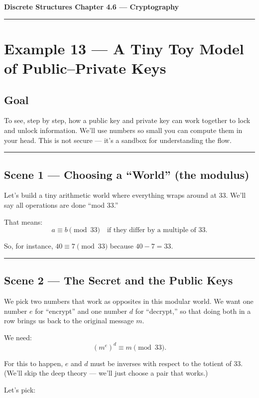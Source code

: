 \documentclass[12pt]{article}
\begin{document}
{\large \textbf{Discrete Structures \quad Chapter 4.6 — Cryptography}}

\hrule
\vspace{0.6em}

\section*{Example 13 — A Tiny Toy Model of Public–Private Keys}

\subsection*{Goal}
To see, step by step, how a public key and private key can work together to lock and unlock information.  
We’ll use numbers so small you can compute them in your head.  
This is not secure — it’s a sandbox for understanding the flow.

\bigskip
\hrule
\vspace{0.5em}

\subsection*{Scene 1 — Choosing a “World” (the modulus)}

Let’s build a tiny arithmetic world where everything wraps around at 33.  
We’ll say all operations are done “mod 33.”

That means:  
\[
a \equiv b \pmod{33}
\quad\text{if they differ by a multiple of 33.}
\]

So, for instance, $40 \equiv 7 \pmod{33}$ because $40-7=33$.

\bigskip
\hrule
\vspace{0.5em}

\subsection*{Scene 2 — The Secret and the Public Keys}

We pick two numbers that work as opposites in this modular world.  
We want one number $e$ for “encrypt” and one number $d$ for “decrypt,”  
so that doing both in a row brings us back to the original message $m$.

We need:
\[
(m^e)^d \equiv m \pmod{33}.
\]

For this to happen, $e$ and $d$ must be inverses with respect to the totient of 33.  
(We’ll skip the deep theory — we’ll just choose a pair that works.)

Let’s pick:
\end{document}
